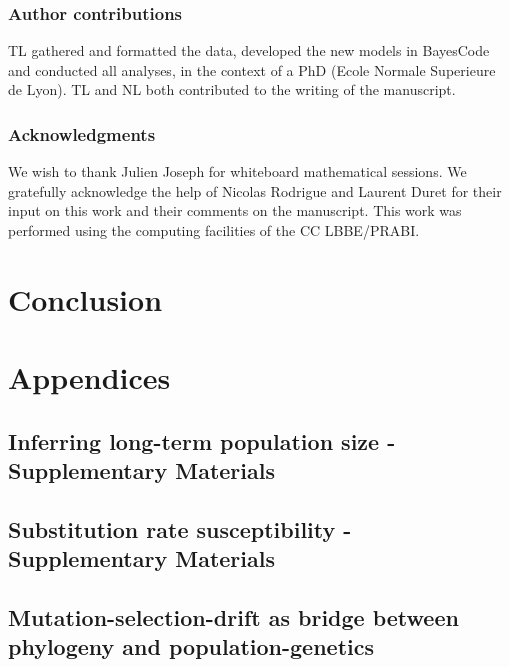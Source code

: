 \documentclass[a4paper,oneside,nobind]{thesis}
\begin{document}
\section{Author contributions}
TL gathered and formatted the data, developed the new models in BayesCode and conducted all analyses, in the context of a PhD (Ecole Normale Superieure de Lyon).
TL and NL both contributed to the writing of the manuscript.

\section{Acknowledgments}
We wish to thank Julien Joseph for whiteboard mathematical sessions.
We gratefully acknowledge the help of Nicolas Rodrigue and Laurent Duret for their input on this work and their comments on the manuscript.
This work was performed using the computing facilities of the CC LBBE/PRABI.

\part{Conclusion}
\label{part:conclusion}


\part{Appendices}

\thispagestyle{empty}
\chapter{Inferring long-term population size - Supplementary Materials}
{\hypersetup{linkcolor=GREYDARK}\minitoc}
\label{chap:MutSelDrift-SuppMat}


\thispagestyle{empty}
\chapter{Substitution rate susceptibility - Supplementary Materials}
{\hypersetup{linkcolor=GREYDARK}\minitoc}
\label{chap:GenoPhenoFit-SuppMat}


\chapter*{Mutation-selection-drift as bridge between phylogeny and population-genetics}
\label{sec-appendix:PRF}

\newpage

\thispagestyle{empty}
\label{sec-appendix:MutSelM3starMBE}


\thispagestyle{empty}


\end{document}
